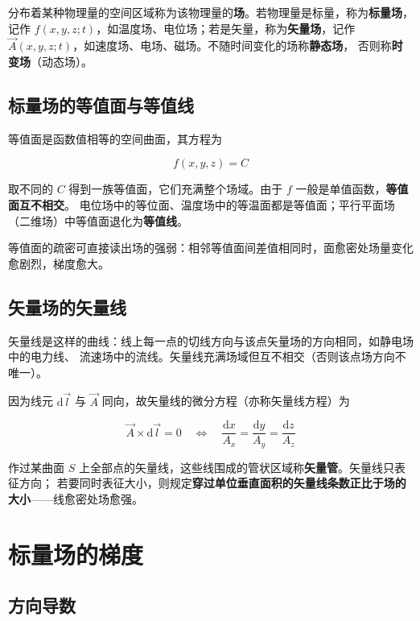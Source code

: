分布着某种物理量的空间区域称为该物理量的\textbf{场}。若物理量是标量，称为\textbf{标量场}，
记作 $f(x,y,z;t)$，如温度场、电位场；若是矢量，称为\textbf{矢量场}，记作
$\vec{A}(x,y,z;t)$，如速度场、电场、磁场。不随时间变化的场称\textbf{静态场}，
否则称\textbf{时变场}（动态场）。

\subsection{标量场的等值面与等值线}

等值面是函数值相等的空间曲面，其方程为
\begin{formulaBox}
\[
f(x,y,z)=C
\]
\end{formulaBox}

取不同的 $C$ 得到一族等值面，它们充满整个场域。由于 $f$ 一般是单值函数，\textbf{等值面互不相交}。
电位场中的等位面、温度场中的等温面都是等值面；平行平面场（二维场）中等值面退化为\textbf{等值线}。

等值面的疏密可直接读出场的强弱：相邻等值面间差值相同时，面愈密处场量变化愈剧烈，梯度愈大。

\subsection{矢量场的矢量线}

矢量线是这样的曲线：线上每一点的切线方向与该点矢量场的方向相同，如静电场中的电力线、
流速场中的流线。矢量线充满场域但互不相交（否则该点场方向不唯一）。

因为线元 $\mathrm{d}\vec{l}$ 与 $\vec{A}$ 同向，故矢量线的微分方程（亦称矢量线方程）为
\begin{formulaBox}
\[
\vec{A}\times\mathrm{d}\vec{l}=0
\quad\Longleftrightarrow\quad
\frac{\mathrm{d}x}{A_x}=\frac{\mathrm{d}y}{A_y}=\frac{\mathrm{d}z}{A_z}
\]
\end{formulaBox}


作过某曲面 $S$ 上全部点的矢量线，这些线围成的管状区域称\textbf{矢量管}。矢量线只表征方向；
若要同时表征大小，则规定\textbf{穿过单位垂直面积的矢量线条数正比于场的大小}——线愈密处场愈强。

\section{标量场的梯度}

\subsection{方向导数}

